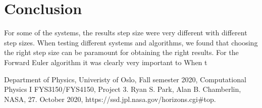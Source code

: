 \documentclass[reprint, english,notitlepage,nofootinbib]{revtex4-1}  %
\begin{document}
\section{Conclusion}

For some of the systems, the results step size were very different with different step sizes.
When testing different systems and algorithms, we found that choosing the right step size can be paramount for obtaining the right results. For the Forward Euler algorithm it was clearly very important to
When t



\onecolumngrid
\vspace{1cm} %
\newpage

\begin{thebibliography}{}
 Department of Physics, Univeristy of Oslo, Fall semester 2020, Computational Physics I FYS3150/FYS4150, Project 3.
 Ryan S. Park, Alan B. Chamberlin, NASA, 27. October 2020, https://ssd.jpl.nasa.gov/horizons.cgi\#top.

\end{thebibliography}
\end{document}
